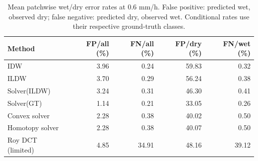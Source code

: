 \begin{table}[H]
\centering\small
\begin{tabular}{lrrrr}
\toprule
Method & FP/all (\%) & FN/all (\%) & FP/dry (\%) & FN/wet (\%) \\
\midrule
IDW & 3.96 & 0.24 & 59.83 & 0.32 \\
ILDW & 3.70 & 0.29 & 56.24 & 0.38 \\
Solver(ILDW) & 3.24 & 0.31 & 46.30 & 0.41 \\
Solver(GT) & 1.14 & 0.21 & 33.05 & 0.26 \\
Convex solver & 2.28 & 0.38 & 40.02 & 0.50 \\
Homotopy solver & 2.28 & 0.38 & 40.07 & 0.50 \\
Roy DCT (limited) & 4.85 & 34.91 & 48.16 & 39.12 \\
\bottomrule
\end{tabular}
\caption{Mean patchwise wet/dry error rates at 0.6 mm/h. False positive: predicted wet, observed dry; false negative: predicted dry, observed wet. Conditional rates use their respective ground-truth classes.}
\label{tab:wet-dry-confusion-merged}
\end{table}
